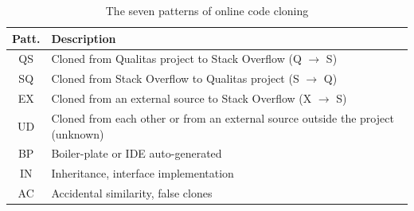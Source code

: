 \documentclass[10pt,journal,compsoc]{IEEEtran}
\begin{document}
\begin{table}
	\centering
	\caption{The seven patterns of online code cloning}
	\label{tab:classification_scheme}
	\begin{tabular}{c@{~~}p{7.35cm}}
		\toprule
		Patt. & Description \\ 
		\midrule
		QS & Cloned from Qualitas project to Stack Overflow (Q $\rightarrow$ S) \\ 
		
		SQ & Cloned from Stack Overflow to Qualitas project (S $\rightarrow$ Q) \\ 
		
		EX & Cloned from an external source to Stack Overflow (X $\rightarrow$ S) \\
		
		UD & Cloned from each other or from an external source
                     outside the project (unknown)\\
		\midrule
		BP & Boiler-plate or IDE auto-generated \\ 
		
		IN & Inheritance, interface implementation  \\ 
		
		AC & Accidental similarity, false clones \\ 
		\bottomrule 
	\end{tabular}  %
\end{table}
\end{document}
